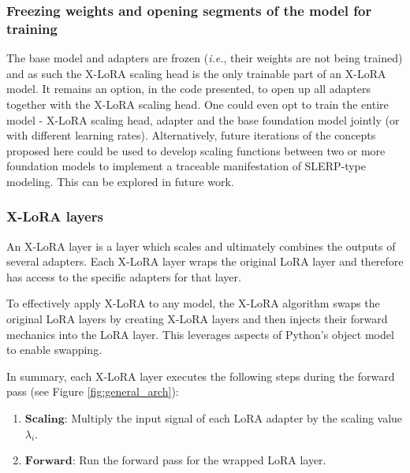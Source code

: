 \documentclass{article}
\begin{document}
\subsubsection{Freezing weights and opening segments of the model for training}
The base model and adapters are frozen ({\it i.e.}, their weights are not being trained) and as such the X-LoRA scaling head is the only trainable part of an X-LoRA model. It remains an option, in the code presented, to open up all adapters together with the X-LoRA scaling head. One could even opt to train the entire model - X-LoRA scaling head, adapter and the base foundation model jointly (or with different learning rates). Alternatively, future iterations of the concepts proposed here could be used to develop scaling functions between two or more foundation models to implement a traceable manifestation of SLERP-type modeling. This can be explored in future work. 

\subsubsection{X-LoRA layers}
An X-LoRA layer is a layer which scales and ultimately combines the outputs of several adapters. Each X-LoRA layer wraps the original LoRA layer and therefore has access to the specific adapters for that layer.

To effectively apply X-LoRA to any model, the X-LoRA algorithm swaps the original LoRA layers by creating X-LoRA layers and then injects their forward mechanics into the LoRA layer. This leverages aspects of Python's object model to enable swapping.

In summary, each X-LoRA layer executes the following steps during the forward pass (see Figure \ref{fig:general_arch}):
\begin{enumerate}
    \item $\mathbf{Scaling}$: Multiply the input signal of each LoRA adapter by the scaling value $\lambda_i$.
    \item $\mathbf{Forward}$: Run the forward pass for the wrapped LoRA layer.
\end{enumerate}
\end{document}
